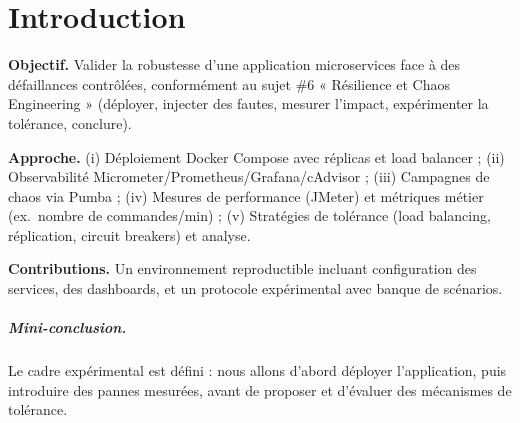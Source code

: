 \chapter*{Introduction}
\textbf{Objectif.} Valider la robustesse d'une application microservices face à des défaillances
contrôlées, conformément au sujet \#6 « Résilience et Chaos Engineering » (déployer, injecter des
fautes, mesurer l'impact, expérimenter la tolérance, conclure).

\textbf{Approche.} (i) Déploiement Docker Compose avec réplicas et load balancer ; (ii) Observabilité
Micrometer/Prometheus/Grafana/cAdvisor ; (iii) Campagnes de chaos via Pumba ; (iv) Mesures
de performance (JMeter) et métriques métier (ex.\ nombre de commandes/min) ; (v) Stratégies de
tolérance (load balancing, réplication, circuit breakers) et analyse.

\textbf{Contributions.} Un environnement reproductible incluant configuration des services, des
dashboards, et un protocole expérimental avec banque de scénarios.

\paragraph{Mini-conclusion.}
Le cadre expérimental est défini : nous allons d'abord déployer l'application, puis
introduire des pannes mesurées, avant de proposer et d'évaluer des mécanismes de tolérance.